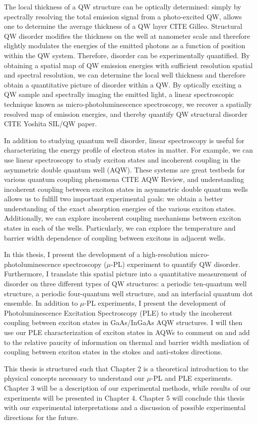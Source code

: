 \indent The local thickness of a QW structure can be optically determined: simply by spectrally resolving the total emission signal from a photo-excited QW, allows one to determine the average thickness of a QW layer CITE Gilleo. Structural QW disorder modifies the thickness on the well at nanometer scale and therefore slightly modulates the energies of the emitted photons as a function of position within the QW system. Therefore, disorder can be experimentally quantified. By obtaining a spatial map of QW emission energies with sufficient resolution spatial and spectral resolution, we can determine the local well thickness and therefore obtain a quantitative picture of disorder within a QW. By optically exciting a QW sample and spectrally imaging the emitted light, a linear spectroscopic technique known as micro-photoluminescence spectroscopy, we recover a spatially resolved map of emission energies, and thereby quantify QW structural disorder CITE Yoshita SIL/QW paper.

\indent In addition to studying quantum well disorder, linear spectroscopy is useful for characterizing the energy profile of electron states in matter. For example, we can use linear spectroscopy to study exciton states and incoherent coupling in the asymmetric double quantum well (AQW). These systems are great testbeds for various quantum coupling phenomena CITE AQW Review, and understanding incoherent coupling between exciton states in asymmetric double quantum wells allows us to fulfill two important experimental goals: we obtain a better understanding of the exact absorption energies of the various exciton states. Additionally, we can explore incoherent coupling mechanisms between exciton states in each of the wells. Particularly, we can explore the temperature and barrier width dependence of coupling between excitons in adjacent wells.


\indent In this thesis, I present the development of a high-resolution micro-photoluminescence spectroscopy ($\mu$-PL) experiment to quantify QW disorder. Furthermore, I translate this spatial picture into a quantitative measurement of disorder on three different types of QW structures: a periodic ten-quantum well structure, a periodic four-quantum well structure, and an interfacial quantum dot ensemble.  In addition to $\mu$-PL experiments, I present the development of Photoluminescence Excitation Spectroscopy (PLE) to study the incoherent coupling between exciton states in GaAs/InGaAs AQW structures. I will then use our PLE characterization of exciton states in AQWs to comment on and add to the relative paucity of information on thermal and barrier width mediation of coupling between exciton states in the stokes and anti-stokes directions. 

\indent This thesis is structured such that Chapter 2 is a theoretical introduction to the physical concepts necessary to understand our $\mu$-PL and PLE experiments. Chapter 3 will be a description of our experimental methods, while results of our experiments will be presented in Chapter 4. Chapter 5 will conclude this thesis with our experimental interpretations and a discussion of possible experimental directions for the future. 